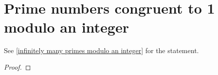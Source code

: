 \section{Prime numbers congruent to 1 modulo an integer}\label{proof: infinitely many primes modulo an integer}

See \cref{infinitely many primes modulo an integer} for the statement.
\begin{proof}
    
\end{proof}